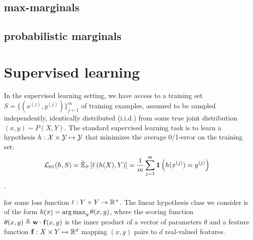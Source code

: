 \subsection{max-marginals}
\subsection{probabilistic marginals}
\section{Supervised learning}
In the supervised learning setting, we have access to a training set
$S = \{(x^{(j)},y^{(j)})\}_{j=1}^m$ of training examples, assumed to be sampled 
independently, identically distributed (i.i.d.) from some true joint 
distribution $(x,y) \sim P(X,Y)$. The standard supervised learning task is to 
learn a hypothesis $h: \mathcal{X} \times \mathcal{Y} \mapsto \mathcal{Y}$ that minimizes the average 0/1-error on the training set: 
\begin{align}
\mathcal{L}_{01}(h,S) = \hat{\mathbb{E}}_{S}\left[
  \ell\left(h(X),Y\right)\right] = \frac{1}{m}\sum_{j=1}^m \mathbf{1}\left(h(x^{(j)}) = y^{(j)}\right)
\end{align}.


for some loss function $\ell: Y \times Y \rightarrow \mathbb{R}^+$. The linear hypothesis class we
consider is of the form $h(x) = \mathop{\arg\max}_y \theta(x,y)$, where the
scoring function $\theta(x,y) \triangleq \mathbf{w} \cdot \mathbf{f}(x,y)$ is the
inner product of a vector of parameters $\theta$ and a feature
function $\mathbf{f}: X \times Y \mapsto \mathbb{R}^d$ mapping $(x,y)$ pairs to
$d$ real-valued features. 


